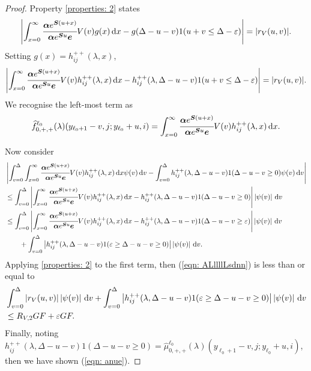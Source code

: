 \begin{proof}
                Property \ref{properties: 2} states
                \begin{align}
                	\left|\int_{x=0}^\infty \cfrac{\boldsymbol \alpha e^{\boldsymbol{S}(u+x)} }{\boldsymbol \alpha e^{\boldsymbol{S}u} \boldsymbol e} V(v)g(x)\, \mathrm{d} x -g(\Delta-u-v) 1(u+v\leq\Delta-\varepsilon)\right| =  |r_V(u,v)|.
                \end{align}
                Setting \(g(x) = h_{ij}^{++}(\lambda,x)\), 
                \begin{align}
                	\left|\int_{x=0}^\infty \cfrac{\boldsymbol \alpha e^{\boldsymbol{S}(u+x)} }{\boldsymbol \alpha e^{\boldsymbol{S}u} \boldsymbol e} V(v)h_{ij}^{++}(\lambda,x)\, \mathrm{d} x -h_{ij}^{++}(\lambda,\Delta-u-v) 1(u+v\leq\Delta-\varepsilon)\right| =  |r_V(u,v)|.
                \end{align}
                We recognise the left-most term as 
                \[\widehat f^{\ell_0}_{0,+,+}(\lambda)(y_{\ell_0+1}-v,j; y_{\ell_0}+u,i) = \int_{x=0}^\infty \cfrac{\boldsymbol \alpha e^{\boldsymbol{S}(u+x)} }{\boldsymbol \alpha e^{\boldsymbol{S}u} \boldsymbol e} V(v)h_{ij}^{++}(\lambda,x)\, \mathrm{d} x.\]
                
                Now consider 
                \begin{align}
                	&\left|\int_{v=0}^\Delta \int_{x=0}^\infty \cfrac{\boldsymbol \alpha e^{\boldsymbol{S}(u+x)} }{\boldsymbol \alpha e^{\boldsymbol{S}u} \boldsymbol e} V(v)h_{ij}^{++} (\lambda,x)\, \mathrm{d} x \psi(v)\, \mathrm{d} v - \int_{v=0}^\Delta h_{ij}^{++}(\lambda,\Delta-u-v) 1(\Delta-u-v\geq 0) \psi(v)\, \mathrm{d} v\right| \nonumber 
                	\\&\leq \int_{v=0}^\Delta \left|  \int_{x=0}^\infty \cfrac{\boldsymbol \alpha e^{\boldsymbol{S}(u+x)} }{\boldsymbol \alpha e^{\boldsymbol{S}u} \boldsymbol e} V(v)h_{ij}^{++} (\lambda,x)\, \mathrm{d} x  - h_{ij}^{++}(\lambda,\Delta-u-v) 1(\Delta-u-v\geq 0) \right| \left| \psi(v) \right| \, \mathrm{d} v\nonumber 
                	\\&\leq \int_{v=0}^\Delta \left|  \int_{x=0}^\infty \cfrac{\boldsymbol \alpha e^{\boldsymbol{S}(u+x)} }{\boldsymbol \alpha e^{\boldsymbol{S}u} \boldsymbol e} V(v)h_{ij}^{++} (\lambda,x)\, \mathrm{d} x  - h_{ij}^{++}(\lambda,\Delta-u-v) 1(\Delta-u-v\geq \varepsilon) \right| \left| \psi(v) \right| \, \mathrm{d} v\nonumber 
                	\\&\qquad {}+ \int_{v=0}^\Delta \left| h_{ij}^{++}(\lambda,\Delta-u-v) 1(\varepsilon \geq \Delta-u-v\geq 0) \right| \left| \psi(v) \right| \, \mathrm{d} v. \label{eqn: ALllllLsdnn}
                \end{align}
                Applying \ref{properties: 2} to the first term, then (\ref{eqn: ALllllLsdnn}) is less than or equal to 
                \begin{align}
                	& \int_{v=0}^\Delta |r_V(u,v)| \left| \psi(v) \right| \, \mathrm{d} v 
                	+ \int_{v=0}^\Delta \left| h_{ij}^{++}(\lambda,\Delta-u-v) 1(\varepsilon \geq \Delta-u-v\geq 0) \right| \left| \psi(v) \right| \, \mathrm{d} v\nonumber 
                	\\&\leq R_{V,2} GF + \varepsilon GF. \nonumber 
                \end{align}
                Finally, noting \(h_{ij}^{++}(\lambda,\Delta-u-v) 1(\Delta-u-v\geq 0)=\widehat \mu_{0,+,+}^{\ell_0}(\lambda)(y_{\ell_0+1}-v,j;y_{\ell_0}+u,i)\), then we have shown (\ref{eqn: anue}). 
                

\end{proof}
